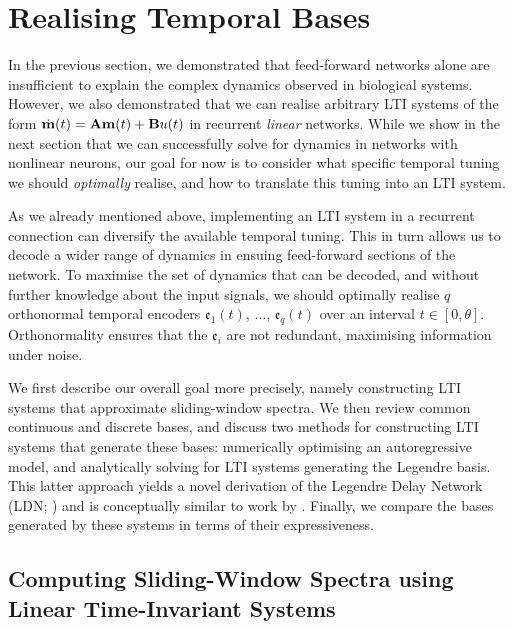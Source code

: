 
\section{Realising Temporal Bases}
\label{sec:temporal_bases}

\newcommand{\cPos}[1]{\textbf{\textcolor{DarkBlue}{#1}}}
\newcommand{\cNeg}[1]{\textbf{\textcolor{DarkRed}{#1}}}

In the previous section, we demonstrated that feed-forward networks alone are insufficient to explain the complex dynamics observed in biological systems.
However, we also demonstrated that we can realise arbitrary LTI systems of the form $\dot{\mathbf{m}}(t) = \mathbf{A} \mathbf{m}(t) + \mathbf{B} u(t)$ in recurrent \emph{linear} networks.
While we show in the next section that we can successfully solve for dynamics in networks with nonlinear neurons, our goal for now is to consider what specific temporal tuning we should \emph{optimally} realise, and how to translate this tuning into an LTI system.

As we already mentioned above, implementing an LTI system in a recurrent connection can diversify the available temporal tuning.
This in turn allows us to decode a wider range of dynamics in ensuing feed-forward sections of the network.
To maximise the set of dynamics that can be decoded, and without further knowledge about the input signals, we should optimally realise $q$ orthonormal temporal encoders $\mathfrak{e}_1(t)$, $\ldots$, $\mathfrak{e}_q(t)$ over an interval $t \in [0, \theta]$.
Orthonormality ensures that the $\mathfrak{e}_i$ are not redundant, maximising information under noise.

We first describe our overall goal more precisely, namely constructing LTI systems that approximate sliding-window spectra.
We then review common continuous and discrete bases, and discuss two methods for constructing LTI systems that generate these bases: numerically optimising an autoregressive model, and analytically solving for LTI systems generating the Legendre basis.
This latter approach yields a novel derivation of the Legendre Delay Network (LDN; \cite{voelker2018improving}) and is conceptually similar to work by \citet{gu2020hippo}.
Finally, we compare the bases generated by these systems in terms of their expressiveness.

\subsection{Computing Sliding-Window Spectra using Linear Time-Invariant Systems}
\label{sec:sliding_window_lti}

